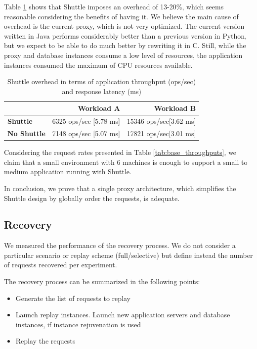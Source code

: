 Table \ref{tab:throughput} shows that Shuttle imposes an overhead of 13-20\%, which seems reasonable considering the benefits of having it. We believe the main cause of overhead is the current proxy, which is not very optimized. The current version written in Java performs considerably better than a previous version in Python, but we expect to be able to do much better by rewriting it in C. Still, while the proxy and database instances consume a low level of resources, the application instances consumed the maximum of CPU resources available.


\begin{table}
\centering
\begin{tabular}{l|rr}
                           &  \textbf{Workload A}   & \textbf{Workload B}  \\ \hline
\textbf{Shuttle}           &  6325 ops/sec [5.78 ms]  &  15346 ops/sec[3.62 ms]  \\
\textbf{No Shuttle}        &  7148 ops/sec [5.07 ms]  &  17821 ops/sec[3.01 ms]  \\
\end{tabular}
\caption{Shuttle overhead in terms of application throughput (ops/sec) and response latency (ms)}
\label{tab:throughput}
\end{table}

Considering the request rates presented in Table \ref{tab:base_throughputs}, we claim that a small environment with 6 machines is enough to support a small to medium application running with Shuttle. 

In conclusion, we prove that a single proxy architecture, which simplifies the Shuttle design by globally order the requests, is adequate. 






\subsection{Recovery}\label{sec:eval:recovery}
We measured the performance of the recovery process. We do not consider a particular scenario or replay scheme (full/selective) but define instead the number of requests recovered per experiment.

The recovery process can be summarized in the following points:

\begin{itemize}
  \item Generate the list of requests to replay
  \item Launch replay instances. Launch new application servers and database instances, if instance rejuvenation is used
  \item Replay the requests
\end{itemize}


